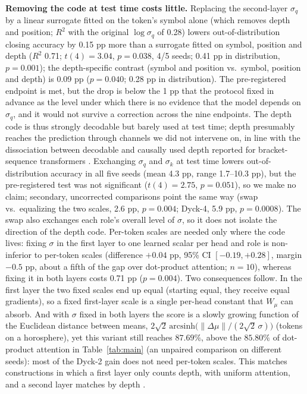 \documentclass[11pt]{article}
\begin{document}
\textbf{Removing the code at test time costs little.} Replacing the second-layer $\sigma_q$ by a linear surrogate fitted on the token's symbol alone (which removes depth and position; $R^2$ with the original $\log\sigma_q$ of 0.28) lowers out-of-distribution closing accuracy by 0.15 pp more than a surrogate fitted on symbol, position and depth ($R^2$ 0.71; $t(4) = 3.04$, $p = 0.038$, 4/5 seeds; 0.41 pp in distribution, $p = 0.001$); the depth-specific contrast (symbol and position vs.\ symbol, position and depth) is 0.09 pp ($p = 0.040$; 0.28 pp in distribution). The pre-registered endpoint is met, but the drop is below the 1 pp that the protocol fixed in advance as the level under which there is no evidence that the model depends on $\sigma_q$, and it would not survive a correction across the nine endpoints. The depth code is thus strongly decodable but barely used at test time; depth presumably reaches the prediction through channels we did not intervene on, in line with the dissociation between decodable and causally used depth reported for bracket-sequence transformers \cite{sharma2026}. Exchanging $\sigma_q$ and $\sigma_k$ at test time lowers out-of-distribution accuracy in all five seeds (mean 4.3 pp, range 1.7--10.3 pp), but the pre-registered test was not significant ($t(4) = 2.75$, $p = 0.051$), so we make no claim; secondary, uncorrected comparisons point the same way (swap vs.\ equalizing the two scales, 2.6 pp, $p = 0.004$; Dyck-4, 5.9 pp, $p = 0.0008$). The swap also exchanges each role's overall level of $\sigma$, so it does not isolate the direction of the depth code. Per-token scales are needed only where the code lives: fixing $\sigma$ in the first layer to one learned scalar per head and role is non-inferior to per-token scales (difference $+0.04$ pp, 95\% CI $[-0.19, +0.28]$, margin $-0.5$ pp, about a fifth of the gap over dot-product attention; $n = 10$), whereas fixing it in both layers costs 0.71 pp ($p = 0.004$). Two consequences follow. In the first layer the two fixed scales end up equal (starting equal, they receive equal gradients), so a fixed first-layer scale is a single per-head constant that $W_\mu$ can absorb. And with $\sigma$ fixed in both layers the score is a slowly growing function of the Euclidean distance between means, $2\sqrt{2}\,\mathrm{arcsinh}\big(\lVert\Delta\mu\rVert/(2\sqrt{2}\,\sigma)\big)$ (tokens on a horosphere), yet this variant still reaches $87.69\%$, above the $85.80\%$ of dot-product attention in Table~\ref{tab:main} (an unpaired comparison on different seeds): most of the Dyck-2 gain does not need per-token scales. This matches constructions in which a first layer only counts depth, with uniform attention, and a second layer matches by depth \cite{yao2021}.
\end{document}
